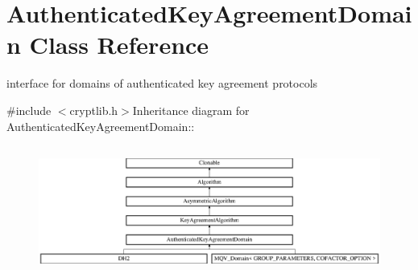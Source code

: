 \hypertarget{class_authenticated_key_agreement_domain}{
\section{AuthenticatedKeyAgreementDomain Class Reference}
\label{class_authenticated_key_agreement_domain}
}


interface for domains of authenticated key agreement protocols  


{\ttfamily \#include $<$cryptlib.h$>$}Inheritance diagram for AuthenticatedKeyAgreementDomain::\begin{figure}[H]
\begin{center}
\leavevmode
\includegraphics[height=4.30769cm]{class_authenticated_key_agreement_domain}
\end{center}
\end{figure}
